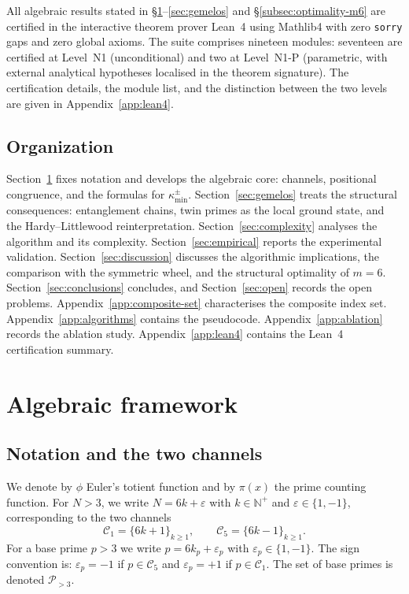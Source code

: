 \documentclass[11pt]{amsart}
\numberwithin{equation}{section}
\newcommand{\NN}{\mathbb{N}}
\newcommand{\cP}{\mathcal{P}}
\newcommand{\kmin}{\kappa_{\min}}
\newcommand{\Cone}{\mathcal{C}_1}
\newcommand{\Cfive}{\mathcal{C}_5}
\theoremstyle{plain}
\theoremstyle{definition}
\begin{document}
All algebraic results stated in \S\ref{sec:algebraic}--\ref{sec:gemelos}
and \S\ref{subsec:optimality-m6} are certified in the interactive
theorem prover Lean~4 \cite{Lean4} using Mathlib4 \cite{Mathlib2020}
with zero \texttt{sorry} gaps and zero global axioms. The suite
comprises nineteen modules: seventeen are certified at Level~N1
(unconditional) and two at Level~N1-P (parametric, with external
analytical hypotheses localised in the theorem signature). The
certification details, the module list, and the distinction between
the two levels are given in Appendix~\ref{app:lean4}.

\subsection{Organization}

Section~\ref{sec:algebraic} fixes notation and develops the algebraic
core: channels, positional congruence, and the formulas for
$\kmin^\pm$. Section~\ref{sec:gemelos} treats the structural
consequences: entanglement chains, twin primes as the local ground
state, and the Hardy--Littlewood reinterpretation.
Section~\ref{sec:complexity} analyses the algorithm and its complexity.
Section~\ref{sec:empirical} reports the experimental validation.
Section~\ref{sec:discussion} discusses the algorithmic implications,
the comparison with the symmetric wheel, and the structural
optimality of $m=6$. Section~\ref{sec:conclusions} concludes, and
Section~\ref{sec:open} records the open problems.
Appendix~\ref{app:composite-set} characterises the composite index
set. Appendix~\ref{app:algorithms} contains the pseudocode.
Appendix~\ref{app:ablation} records the ablation study.
Appendix~\ref{app:lean4} contains the Lean~4 certification summary.

\section{Algebraic framework}
\label{sec:algebraic}

\subsection{Notation and the two channels}
\label{subsec:notation}

We denote by $\phi$ Euler's totient function and by $\pi(x)$ the prime
counting function. For $N>3$, we write $N=6k+\varepsilon$ with
$k\in\NN^+$ and $\varepsilon\in\{1,-1\}$, corresponding to the two
channels
\begin{equation}
\Cone=\{6k+1\}_{k\ge 1},\qquad \Cfive=\{6k-1\}_{k\ge 1}.
\label{eq:channels}
\end{equation}
For a base prime $p>3$ we write $p=6k_p+\varepsilon_p$ with
$\varepsilon_p\in\{1,-1\}$. The sign convention is: $\varepsilon_p=-1$
if $p\in\Cfive$ and $\varepsilon_p=+1$ if $p\in\Cone$. The set of base
primes is denoted $\cP_{>3}$.
\end{document}
